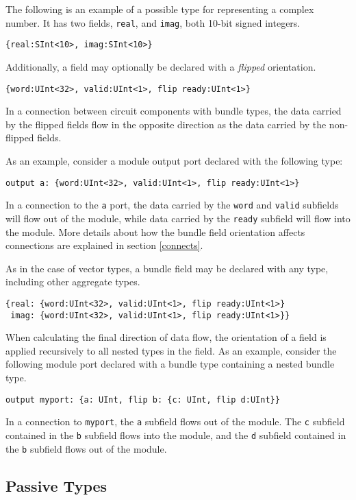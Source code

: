 \documentclass[12pt]{article}
\begin{document}
The following is an example of a possible type for representing a complex number. It has two fields, \verb|real|, and \verb|imag|, both 10-bit signed integers.
\begin{lstlisting}
{real:SInt<10>, imag:SInt<10>}
\end{lstlisting}

Additionally, a field may optionally be declared with a {\em flipped} orientation.
\begin{lstlisting}
{word:UInt<32>, valid:UInt<1>, flip ready:UInt<1>}
\end{lstlisting}
In a connection between circuit components with bundle types, the data carried by the flipped fields flow in the opposite direction as the data carried by the non-flipped fields.

As an example, consider a module output port declared with the following type:
\begin{lstlisting}
output a: {word:UInt<32>, valid:UInt<1>, flip ready:UInt<1>}
\end{lstlisting}
In a connection to the \verb|a| port, the data carried by the \verb|word| and \verb|valid| subfields will flow out of the module, while data carried by the \verb|ready| subfield will flow into the module. More details about how the bundle field orientation affects connections are explained in section \ref{connects}.

As in the case of vector types, a bundle field may be declared with any type, including other aggregate types. 
\begin{lstlisting}
{real: {word:UInt<32>, valid:UInt<1>, flip ready:UInt<1>}
 imag: {word:UInt<32>, valid:UInt<1>, flip ready:UInt<1>}}
\end{lstlisting}

When calculating the final direction of data flow, the orientation of a field is applied recursively to all nested types in the field. As an example, consider the following module port declared with a bundle type containing a nested bundle type.
\begin{lstlisting}
output myport: {a: UInt, flip b: {c: UInt, flip d:UInt}}
\end{lstlisting}
In a connection to \verb|myport|, the \verb|a| subfield flows out of the module. The \verb|c| subfield contained in the \verb|b| subfield flows into the module, and the \verb|d| subfield contained in the \verb|b| subfield flows out of the module.

\subsection{Passive Types} \label{passive_types}
\end{document}
